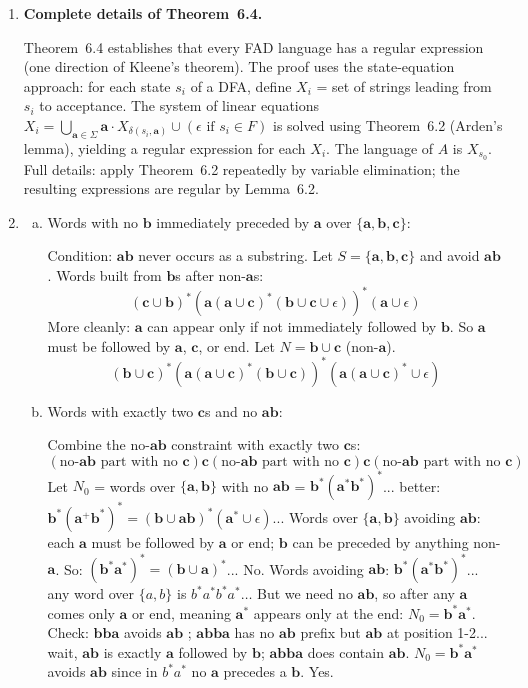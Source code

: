 \begin{enumerate}[{6.}1.]
\item \textbf{Complete details of Theorem~6.4.}

Theorem~6.4 establishes that every FAD language has a regular expression (one direction of Kleene's theorem).  The proof uses the state-equation approach: for each state $s_i$ of a DFA, define $X_i$ = set of strings leading from $s_i$ to acceptance.  The system of linear equations $X_i=\bigcup_{\pmb{a}\in\Sigma}\pmb{a}\cdot X_{\delta(s_i,\pmb{a})}\cup(\epsilon\text{ if }s_i\in F)$ is solved using Theorem~6.2 (Arden's lemma), yielding a regular expression for each $X_i$.  The language of $A$ is $X_{s_0}$.  Full details: apply Theorem~6.2 repeatedly by variable elimination; the resulting expressions are regular by Lemma~6.2.

\item \begin{enumerate}[(a)]
  \item Words with no $\pmb{b}$ immediately preceded by $\pmb{a}$ over $\{\pmb{a},\pmb{b},\pmb{c}\}$:

  Condition: $\pmb{ab}$ never occurs as a substring.  Let $S=\{\pmb{a},\pmb{b},\pmb{c}\}$ and avoid $\pmb{ab}$.  Words built from $\pmb{b}$s after non-$\pmb{a}$s:
  \[
    (\pmb{c}\cup\pmb{b})^*(\pmb{a}(\pmb{a}\cup\pmb{c})^*(\pmb{b}\cup\pmb{c}\cup\epsilon))^*(\pmb{a}\cup\epsilon)
  \]
  More cleanly: $\pmb{a}$ can appear only if not immediately followed by $\pmb{b}$.  So $\pmb{a}$ must be followed by $\pmb{a}$, $\pmb{c}$, or end.  Let $N=\pmb{b}\cup\pmb{c}$ (non-$\pmb{a}$).
  \[
    (\pmb{b}\cup\pmb{c})^*(\pmb{a}(\pmb{a}\cup\pmb{c})^*(\pmb{b}\cup\pmb{c}))^*(\pmb{a}(\pmb{a}\cup\pmb{c})^*\cup\epsilon)
  \]

  \item Words with exactly two $\pmb{c}$s and no $\pmb{ab}$:

  Combine the no-$\pmb{ab}$ constraint with exactly two $\pmb{c}$s:
  \[
    (\text{no-$\pmb{ab}$ part with no $\pmb{c}$})\pmb{c}(\text{no-$\pmb{ab}$ part with no $\pmb{c}$})\pmb{c}(\text{no-$\pmb{ab}$ part with no $\pmb{c}$})
  \]
  Let $N_0$ = words over $\{\pmb{a},\pmb{b}\}$ with no $\pmb{ab}$ = $\pmb{b}^*(\pmb{a}^*\pmb{b}^*)^*$... better: $\pmb{b}^*(\pmb{a}^+\pmb{b}^*)^*= (\pmb{b}\cup\pmb{ab})^*(\pmb{a}^*\cup\epsilon)$...
  Words over $\{\pmb{a},\pmb{b}\}$ avoiding $\pmb{ab}$: each $\pmb{a}$ must be followed by $\pmb{a}$ or end; $\pmb{b}$ can be preceded by anything non-$\pmb{a}$.  So: $(\pmb{b}^*\pmb{a}^*)^*=(\pmb{b}\cup\pmb{a})^*$... No.
  Words avoiding $\pmb{ab}$: $\pmb{b}^*(\pmb{a}^*\pmb{b}^*)^*$... any word over $\{a,b\}$ is $b^*a^*b^*a^*\ldots$ But we need no $\pmb{ab}$, so after any $\pmb{a}$ comes only $\pmb{a}$ or end, meaning $\pmb{a}^*$ appears only at the end: $N_0=\pmb{b}^*\pmb{a}^*$.  Check: $\pmb{bba}$ avoids $\pmb{ab}$ \checkmark; $\pmb{abba}$ has no $\pmb{ab}$ prefix but $\pmb{ab}$ at position 1-2... wait, $\pmb{ab}$ is exactly $\pmb{a}$ followed by $\pmb{b}$; $\pmb{abba}$ does contain $\pmb{ab}$.  $N_0=\pmb{b}^*\pmb{a}^*$ avoids $\pmb{ab}$ since in $b^*a^*$ no $\pmb{a}$ precedes a $\pmb{b}$.  Yes.


\end{enumerate}
\end{enumerate}

